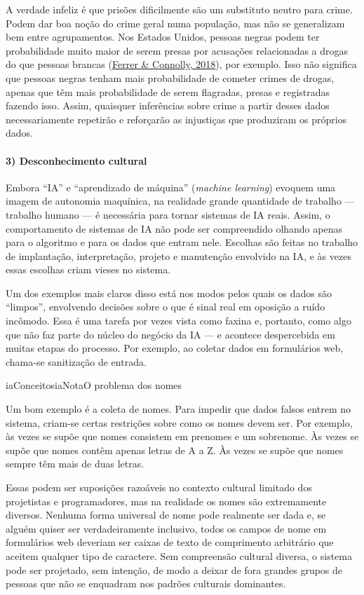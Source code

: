\documentclass[
  11pt,
]{article}
\newenvironment{tecnica}[1][Nota tecnica]{\begin{iabox}{iaConceitos}{iaNota}{#1}}{\end{iabox}}
\begin{document}
A verdade infeliz é que prisões dificilmente são um substituto neutro
para crime. Podem dar boa noção do crime geral numa população, mas não
se generalizam bem entre agrupamentos. Nos Estados Unidos, pessoas
negras podem ter probabilidade muito maior de serem presas por acusações
relacionadas a drogas do que pessoas brancas
(\href{https://www.ncbi.nlm.nih.gov/pmc/articles/PMC6050822/}{Ferrer \&
Connolly, 2018}), por exemplo. Isso não significa que pessoas negras
tenham mais probabilidade de cometer crimes de drogas, apenas que têm
mais probabilidade de serem flagradas, presas e registradas fazendo
isso. Assim, quaisquer inferências sobre crime a partir desses dados
necessariamente repetirão e reforçarão as injustiças que produziram os
próprios dados.

\paragraph{3) Desconhecimento cultural}\label{desconhecimento-cultural}

Embora ``IA'' e ``aprendizado de máquina'' (\emph{machine learning})
evoquem uma imagem de autonomia maquínica, na realidade grande
quantidade de trabalho --- trabalho humano --- é necessária para tornar
sistemas de IA reais. Assim, o comportamento de sistemas de IA não pode
ser compreendido olhando apenas para o algoritmo e para os dados que
entram nele. Escolhas são feitas no trabalho de implantação,
interpretação, projeto e manutenção envolvido na IA, e às vezes essas
escolhas criam vieses no sistema.

Um dos exemplos mais claros disso está nos modos pelos quais os dados
são ``limpos'', envolvendo decisões sobre o que é sinal real em oposição
a ruído incômodo. Essa é uma tarefa por vezes vista como faxina e,
portanto, como algo que não faz parte do núcleo do negócio da IA --- e
acontece despercebida em muitas etapas do processo. Por exemplo, ao
coletar dados em formulários web, chama-se sanitização de entrada.

\begin{tecnica}[O problema dos nomes]

Um bom exemplo é a coleta de nomes. Para impedir que dados falsos entrem
no sistema, criam-se certas restrições sobre como os nomes devem ser.
Por exemplo, às vezes se supõe que nomes consistem em prenomes e um
sobrenome. Às vezes se supõe que nomes contêm apenas letras de A a Z. Às
vezes se supõe que nomes sempre têm mais de duas letras.

Essas podem ser suposições razoáveis no contexto cultural limitado dos
projetistas e programadores, mas na realidade os nomes são extremamente
diversos. Nenhuma forma universal de nome pode realmente ser dada e, se
alguém quiser ser verdadeiramente inclusivo, todos os campos de nome em
formulários web deveriam ser caixas de texto de comprimento arbitrário
que aceitem qualquer tipo de caractere. Sem compreensão cultural
diversa, o sistema pode ser projetado, sem intenção, de modo a deixar de
fora grandes grupos de pessoas que não se enquadram nos padrões
culturais dominantes.

\end{tecnica}
\end{document}
